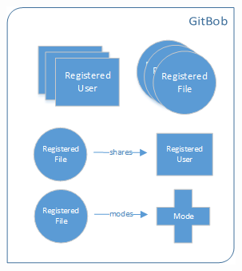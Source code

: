 \documentclass[paper=a4, fontsize=11pt]{scrartcl} %
\numberwithin{equation}{section} %
\numberwithin{figure}{section} %
\numberwithin{table}{section} %
\begin{document}
\begin{figure}
\centering
 \begin{minipage}[b]{0.5\textwidth}
    \includegraphics[width=\textwidth]{sig_gitbob.png}
    \label{fig:gitbob}
    \caption{}
  \end{minipage}
\end{figure}
\end{document}
